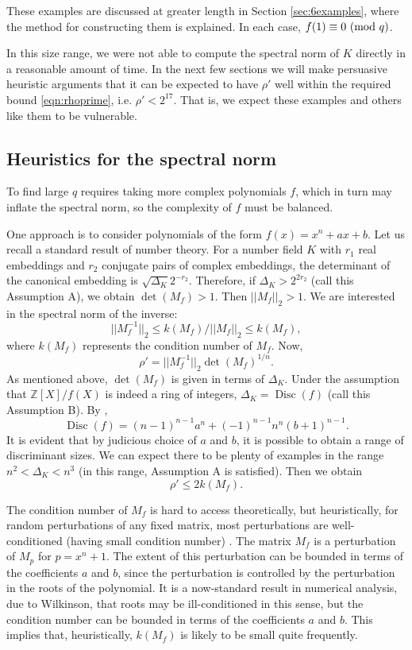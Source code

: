 \documentclass{llncs}
\newcommand{\ZZ}{\mathbb{Z}}
\newcommand{\Disc}{\operatorname{Disc}}
\newcommand{\MOD}[1]{~(\textup{mod}~#1)}
\renewcommand{\pmod}{\MOD}
\newcommand{\<}{\langle}
\renewcommand{\>}{\rangle}
\begin{document}
These examples are discussed at greater length in Section \ref{sec:6examples}, where the method for constructing them is explained.
In each case, $f(1) \equiv 0 \pmod q$.

In this size range, we were not able to compute the spectral norm of $K$ directly in a reasonable amount of time.  In the next few sections we will make persuasive heuristic arguments that it can be expected to have $\rho'$ well within the required bound \eqref{eqn:rhoprime}, i.e. $\rho' < 2^{17}$.  That is, we expect these examples and others like them to be vulnerable.


\subsection{Heuristics for the spectral norm}

To find large $q$ requires taking more complex polynomials $f$, which in turn may inflate the spectral norm, so the complexity of $f$ must be balanced.

One approach is to consider polynomials of the form $f(x) =  x^n + ax + b$.
Let us recall a standard result of number theory.  For a number field $K$ with $r_1$ real embeddings and $r_2$ conjugate pairs of complex embeddings, the determinant of the canonical embedding is
        $\sqrt{\Delta_K}2^{-r_2}$.
Therefore, if $\Delta_K > 2^{2r_2}$ (call this Assumption A), we obtain $\det(M_f) > 1$.  Then $|| M_f ||_2 > 1$.  We are interested in the spectral norm of the inverse:
\[
        ||M_f^{-1}||_2 \le k(M_f)/||M_f||_2 \le k(M_f),
\]
where $k(M_f)$ represents the condition number of $M_f$.  Now,
\[
        \rho' = ||M_f^{-1}||_2\det(M_f)^{1/n}.
\]
As mentioned above, $\det(M_f)$ is given in terms of $\Delta_K$.  Under the assumption that $\ZZ[X]/f(X)$ is indeed a ring of integers, $\Delta_K = \Disc(f)$ (call this Assumption B).   By \cite{Masser},
\[
        \Disc(f) = (n-1)^{n-1}a^n + (-1)^{n-1}n^n(b+1)^{n-1}.
\]
        It is evident that by judicious choice of $a$ and $b$, it is possible to obtain a range of discriminant sizes.  We can expect there to be plenty of examples in the range $ n^2 < \Delta_K < n^3$ (in this range, Assumption A is satisfied).  Then we obtain
        \[
        \rho' \le 2 k(M_f).
\]

The condition number of $M_f$ is hard to access theoretically, but heuristically, for random perturbations of any fixed matrix, most perturbations are well-conditioned (having small condition number) \cite{TV}.  The matrix $M_f$ is a perturbation of $M_p$ for $p = x^n+1$.
The extent of this perturbation can be bounded in terms of the coefficients $a$ and $b$, since the perturbation is controlled by the perturbation in the roots of the polynomial.  It is a now-standard result in numerical analysis, due to Wilkinson, that roots may be ill-conditioned in this sense, but the condition number can be bounded in terms of the coefficients $a$ and $b$.  This implies that, heuristically, $k(M_f)$ is likely to be small quite frequently.
\end{document}
